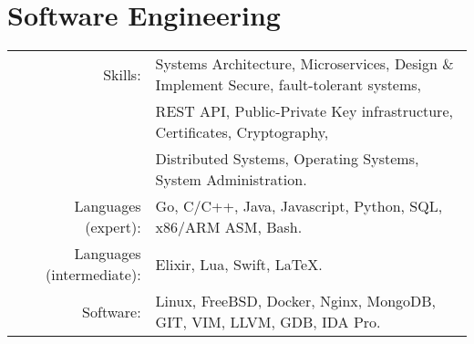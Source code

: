 \documentclass[lettersize,10pt]{article}
\begin{document}
\section{Software Engineering}
\begin{tabular}{rl}
Skills:& Systems Architecture, Microservices, Design \& Implement Secure, fault-tolerant systems, \\
       & REST API, Public-Private Key infrastructure, Certificates, Cryptography, \\ 
       & Distributed Systems, Operating Systems, System Administration. \\
Languages (expert):& Go, C/C++, Java, Javascript, Python, SQL, x86/ARM ASM, Bash. \\
Languages (intermediate):& Elixir, Lua, Swift, \LaTeX. \\
Software:& Linux, FreeBSD, Docker, Nginx, MongoDB, GIT, VIM, LLVM, GDB, IDA Pro. \\
\end{tabular}


\end{document}
